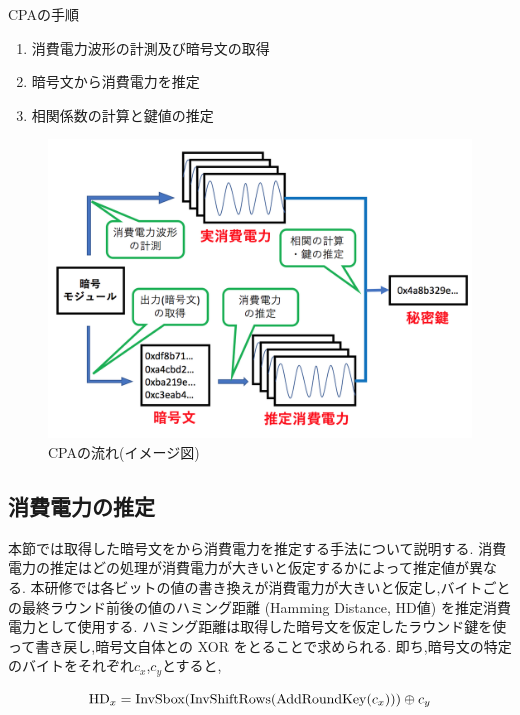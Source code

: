 \documentclass[11pt]{jarticle}
\begin{document}
\begin{itembox}[l]{CPAの手順}
\begin{enumerate}
\item 消費電力波形の計測及び暗号文の取得
\item 暗号文から消費電力を推定
\item 相関係数の計算と鍵値の推定
\end{enumerate}
\end{itembox}

\newpage
\restoregeometry
\begin{figure}[htbp]
	\begin{center}
		\includegraphics[width=\hsize, bb=0 0 600 450]{../images/CPA_image1.png}
		\caption{CPAの流れ(イメージ図)}
	\end{center}
\end{figure}

\subsection{消費電力の推定}
本節では取得した暗号文をから消費電力を推定する手法について説明する.
消費電力の推定はどの処理が消費電力が大きいと仮定するかによって推定値が異なる.
本研修では各ビットの値の書き換えが消費電力が大きいと仮定し,バイトごとの最終ラウンド前後の値のハミング距離 (Hamming Distance, HD値) を推定消費電力として使用する.
ハミング距離は取得した暗号文を仮定したラウンド鍵を使って書き戻し,暗号文自体との XOR をとることで求められる.
即ち,暗号文の特定のバイトをそれぞれ$c_x$,$c_y$とすると,

\begin{equation}
{\rm HD}_{x} = {\rm InvSbox(InvShiftRows(AddRoundKey}(c_{x}))) \oplus c_{y}
\end{equation}
\end{document}
